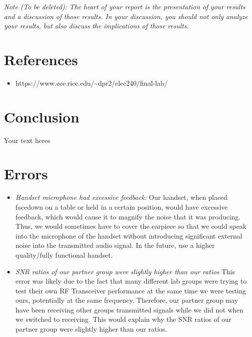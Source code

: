 \documentclass[10pt]{article}
\begin{document}
\textit{Note (To be deleted): The heart of your report is the presentation of your results and a discussion of those results. In your discussion, you should not only analyze your results, but also discuss the implications of those results.}

\section{References}


\medskip

\begin{itemize}
	\item https://www.ece.rice.edu/\~{}dpr2/elec240/final-lab/
\end{itemize}
\section{Conclusion}

Your text heres

\medskip


\section{Errors}

\begin{itemize}
	\item \textit{Handset microphone had excessive feedback:} Our handset, when placed facedown on a table or held in a certain position, would have excessive feedback, which would cause it to magnify the noise that it was producing. Thus, we would sometimes have to cover the earpiece so that we could speak into the microphone of the handset without introducing significant external noise into the transmitted audio signal. In the future, use a higher quality/fully functional handset. 
	
	\item \textit{SNR ratios of our partner group were slightly higher than our ratios} This error was likely due to the fact that many different lab groups were trying to test their own RF Transceiver performance at the same time we were testing ours, potentially at the same frequency. Therefore, our partner group may have been receiving other groups transmitted signals while we did not when we switched to receiving. This would explain why the SNR ratios of our partner group were slightly higher than our ratios. 
\end{itemize}

\medskip

\end{document}

